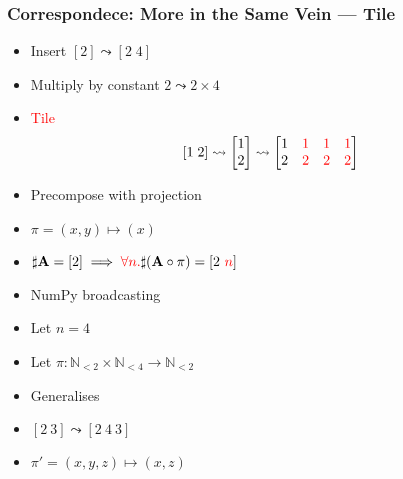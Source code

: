 \documentclass[xetex,mathserif,serif]{beamer}
\newcommand\mrm[1]{\mathrm{#1}}
\newcommand\brm[1]{\bm{\mrm{#1}}}
\newcommand\Nat{\mathbb{N}}
\newcommand\NB[1]{\textcolor{red}{#1}}
\begin{document}
\begin{frame}
  \frametitle{Correspondece: More in the Same Vein --- Tile}
  \pause
  \begin{itemize}[<+->]
    \item Insert \([2] \leadsto [2\;4]\)
    \item Multiply by constant \(2\leadsto 2\times 4\)
    \item \NB{Tile} \[
      [1\;2]\leadsto
      \begin{bmatrix} 1 \\ 2 \end{bmatrix}\leadsto
      \begin{bmatrix} 1 & \NB 1 & \NB 1 & \NB  1 \\ 2 & \NB 2 & \NB 2 & \NB 2 \end{bmatrix}
    \]
    \item Precompose with projection
    \item \(\pi = (x, y) \mapsto (x)\)
    \item \(\sharp \brm A = [2] \implies \NB{\forall n.} \sharp(\brm A \circ \pi) = [2\ \NB n]\)
    \item NumPy broadcasting
    \item Let \(n = 4\)
    \item Let \(\pi : \Nat_{<2} \times \Nat_{<4} \to \Nat_{<2}\)
    \item Generalises
    \item \([2\ 3] \leadsto [2\ 4\ 3]\)
    \item \(\pi' = (x, y, z) \mapsto (x, z)\)
  \end{itemize}
\end{frame}
\end{document}
